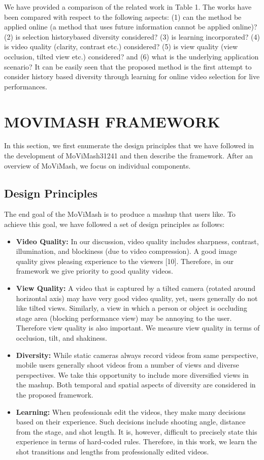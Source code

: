 \documentclass{sig-alternate-05-2015}
\begin{document}
We have provided a comparison of the related work in Table 1.
The works have been compared with respect to the following aspects:
(1) can the method be applied online (a method that uses future
information cannot be applied online)? (2) is selection historybased
diversity considered? (3) is learning incorporated? (4) is
video quality (clarity, contrast etc.) considered? (5) is view quality
(view occlusion, tilted view etc.) considered? and (6) what is the
underlying application scenario? It can be easily seen that the proposed
method is the first attempt to consider history based diversity
through learning for online video selection for live performances.

\section{MOVIMASH FRAMEWORK}
In this section, we first enumerate the design principles that we
have followed in the development of MoViMash31241 and then describe
the framework. After an overview of MoViMash, we focus on individual
components.

\subsection{Design Principles}
The end goal of the MoViMash is to produce a mashup that users
like. To achieve this goal, we have followed a set of design principles
as follows:

\begin{itemize}
\item \textbf{Video Quality:}
In our discussion, video quality includes
sharpness, contrast, illumination, and blockiness (due to video
compression). A good image quality gives pleasing experience
to the viewers [10]. Therefore, in our framework we
give priority to good quality videos.
\item \textbf{View Quality:}
A video that is captured by a tilted camera
(rotated around horizontal axis) may have very good video
quality, yet, users generally do not like tilted views. Similarly,
a view in which a person or object is occluding stage
area (blocking performance view) may be annoying to the user. Therefore view quality is also important. We measure
view quality in terms of occlusion, tilt, and shakiness.
\item \textbf{Diversity:}
While static cameras always record videos from
same perspective, mobile users generally shoot videos from
a number of views and diverse perspectives. We take this
opportunity to include more diversified views in the mashup.
Both temporal and spatial aspects of diversity are considered
in the proposed framework.
\item \textbf{Learning:}
When professionals edit the videos, they make
many decisions based on their experience. Such decisions
include shooting angle, distance from the stage, and shot
length. It is, however, difficult to precisely state this experience
in terms of hard-coded rules. Therefore, in this work,
we learn the shot transitions and lengths from professionally
edited videos.
\end{itemize}
\end{document}
